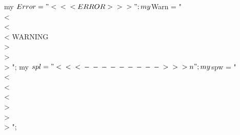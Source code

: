 \documentclass[11pt]{article}
\def\nwendcode{\endtrivlist \endgroup} %
\let\nwdocspar=\par                    %
\begin{document}

\nwenddocs{}\plusendmoddef
my $Error = "\\<\\<\\<  ERROR  \\>\\>\\> ";
my $Warn  = "\\<\\<\\< WARNING \\>\\>\\> ";
my $spl   = "\\<\\<\\<\\-\\-\\-\\-\\-\\-\\-\\-\\-\\>\\>\\>\\n";
my $spw   = "\\<\\<\\<         \\>\\>\\> ";
\nwendcode{}\nwdocspar
\end{document}

